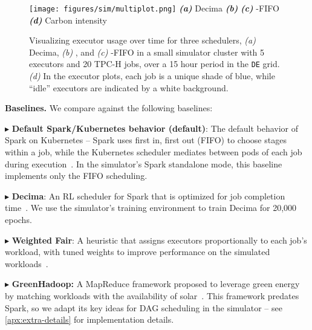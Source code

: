 \begin{figure*}[t]
    \centering
    \texttt{[image: figures/sim/multiplot.png]}
    \vspace{-0.2cm}
    {\raggedleft
    \hspace{5.5em} \textbf{\textit{(a)}} Decima \hspace{6em} \textbf{\textit{(b)}} \PCAPS \hspace{6em} \textbf{\textit{(c)}} \CAP-FIFO \hspace{6em} \textbf{\textit{(d)}} Carbon intensity \hfill}
    \caption{ Visualizing executor usage over time for three schedulers, \textit{(a)} Decima, \textit{(b)} \PCAPS, and \textit{(c)} \CAP-FIFO in a small simulator cluster with 5 executors and 20 TPC-H jobs, over a 15 hour period in the \textnormal{\texttt{DE}} grid. \textit{(d)} In the executor plots, each job is a unique shade of blue, while ``idle'' executors are indicated by a white background. }
    \vspace{-0.4cm}
    \label{fig:multiplot}
\end{figure*}

\vspace{0.05cm}
\noindent\textbf{Baselines.}
We compare against the following baselines:


$\blacktriangleright$ \textbf{Default Spark/Kubernetes behavior (default)}:
The default behavior of Spark on Kubernetes -- Spark uses first in, first out (FIFO) to choose stages within a job, while the Kubernetes scheduler mediates between pods of each job during execution~\cite{SparkKubernetes}. 
In the simulator's Spark standalone mode, this baseline implements only the FIFO scheduling.  



$\blacktriangleright$ \textbf{Decima}:
An RL scheduler for Spark that is optimized for job completion time~\cite{Hongzi:2019:Decima}.  We use the simulator's training environment to train Decima for 20,000 epochs.


$\blacktriangleright$ \textbf{Weighted Fair}: A heuristic that assigns executors proportionally to each job's workload, with tuned weights to improve performance on the simulated workloads~\cite{Hongzi:2019:Decima}. 

$\blacktriangleright$ \textbf{GreenHadoop:} A MapReduce framework proposed to leverage green energy by matching workloads with the availability of solar~\cite{Goiri:2012:GreenHadoop}.  This framework predates Spark, so we adapt its key ideas for DAG scheduling in the simulator -- see \autoref{apx:extra-details} for implementation details.



